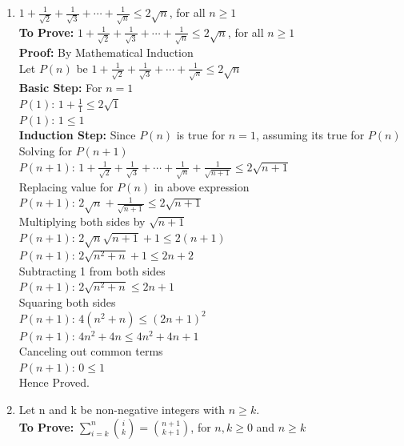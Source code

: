 \documentclass[12pt]{article}
\begin{document}
\begin{enumerate}
\begin{enumerate}
\begin{enumerate}
\item {$\displaystyle{ 1 + \frac{1}{\sqrt{2}} + \frac{1}{\sqrt{3}} + \cdots +  \frac{1}{\sqrt{n}} \le 2\sqrt{n}}$, for all $n \ge 1$}\\
\textbf{To Prove:} {$\displaystyle{ 1 + \frac{1}{\sqrt{2}} + \frac{1}{\sqrt{3}} + \cdots +  \frac{1}{\sqrt{n}} \le 2\sqrt{n}}$, for all $n \ge 1$}\\
\textbf{Proof:} By Mathematical Induction \\
Let $P(n)$ be {$\displaystyle{1 + \frac{1}{\sqrt{2}} + \frac{1}{\sqrt{3}} + \cdots +  \frac{1}{\sqrt{n}} \le 2\sqrt{n}}$}\\
\textbf{Basic Step:} For $n = 1$\\
$P(1)$:  $\displaystyle{1 + \frac{1}{1}  \le 2\sqrt{1}}$\\
$P(1)$: $\displaystyle{1 \le 1}$\\
\textbf{Induction Step:} Since $P(n) $ is true for $ n = 1$, assuming its true for $P(n)$\\
Solving for $P(n+1)$\\
$P(n+1)$: {$\displaystyle{1 + \frac{1}{\sqrt{2}} + \frac{1}{\sqrt{3}} + \cdots +  \frac{1}{\sqrt{n}} + \frac{1}{\sqrt{n+1}} \le 2\sqrt{n+1}}$}\\
Replacing value for $P(n)$ in above expression\\
$P(n+1)$: {$\displaystyle{2\sqrt{n} + \frac{1}{\sqrt{n+1}} \le 2\sqrt{n+1}}$}\\
Multiplying both sides by $\displaystyle{\sqrt{n+1}}$\\
$P(n+1)$: {$\displaystyle{2\sqrt{n}\sqrt{n+1}+ 1 \le 2(n+1)}$}\\
$P(n+1)$: {$\displaystyle{2\sqrt{n^2 + n} + 1 \le 2n+2}$}\\
Subtracting 1 from both sides\\
$P(n+1)$: {$\displaystyle{2\sqrt{n^2 + n}  \le 2n+1}$}\\
Squaring both sides\\
$P(n+1)$: {$\displaystyle{4(n^2 +n) \le (2n+1)^2}$}\\
$P(n+1)$: {$\displaystyle{4n^2 +4n \le 4n^2+4n+1}$}\\
Canceling out common terms\\
$P(n+1)$: $\displaystyle{0 \le 1}$\\
Hence Proved.\\
\pagebreak
\item {Let n and k be non-negative integers with $n \ge k.$} \\
\textbf{To Prove:} $\displaystyle{\sum^{n}_{i=k} {i \choose k} = {n+1 \choose k+1}}$, for $n,k \ge 0$ and $n \ge k$\\

\end{enumerate}
\end{enumerate}
\end{enumerate}
\end{document}
